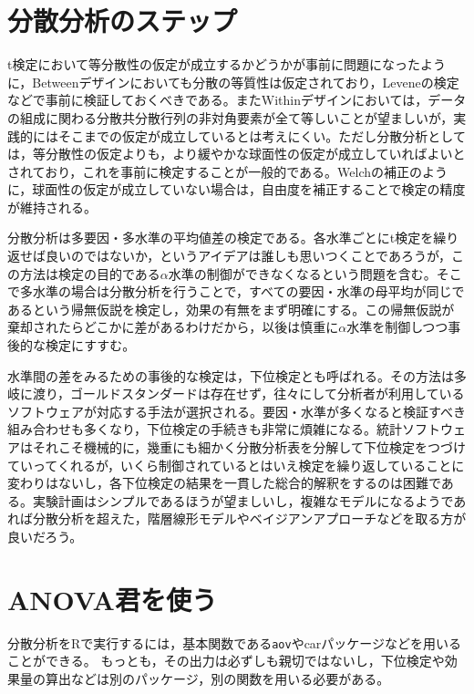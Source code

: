 \documentclass[
  a4paper,
]{ltjsbook}
\begin{document}
\section{分散分析のステップ}\label{ux5206ux6563ux5206ux6790ux306eux30b9ux30c6ux30c3ux30d7}

t検定において等分散性の仮定が成立するかどうかが事前に問題になったように，Betweenデザインにおいても分散の等質性は仮定されており，Leveneの検定などで事前に検証しておくべきである。またWithinデザインにおいては，データの組成に関わる分散共分散行列の非対角要素が全て等しいことが望ましいが，実践的にはそこまでの仮定が成立しているとは考えにくい。ただし分散分析としては，等分散性の仮定よりも，より緩やかな球面性の仮定が成立していればよいとされており，これを事前に検定することが一般的である。Welchの補正のように，球面性の仮定が成立していない場合は，自由度を補正することで検定の精度が維持される。

分散分析は多要因・多水準の平均値差の検定である。各水準ごとにt検定を繰り返せば良いのではないか，というアイデアは誰しも思いつくことであろうが，この方法は検定の目的である\(\alpha\)水準の制御ができなくなるという問題を含む。そこで多水準の場合は分散分析を行うことで，すべての要因・水準の母平均が同じであるという帰無仮説を検定し，効果の有無をまず明確にする。この帰無仮説が棄却されたらどこかに差があるわけだから，以後は慎重に\(\alpha\)水準を制御しつつ事後的な検定にすすむ。

水準間の差をみるための事後的な検定は，下位検定とも呼ばれる。その方法は多岐に渡り，ゴールドスタンダードは存在せず，往々にして分析者が利用しているソフトウェアが対応する手法が選択される。要因・水準が多くなると検証すべき組み合わせも多くなり，下位検定の手続きも非常に煩雑になる。統計ソフトウェアはそれこそ機械的に，幾重にも細かく分散分析表を分解して下位検定をつづけていってくれるが，いくら制御されているとはいえ検定を繰り返していることに変わりはないし，各下位検定の結果を一貫した総合的解釈をするのは困難である。実験計画はシンプルであるほうが望ましいし，複雑なモデルになるようであれば分散分析を超えた，階層線形モデルやベイジアンアプローチなどを取る方が良いだろう。

\section{ANOVA君を使う}\label{anovaux541bux3092ux4f7fux3046}

分散分析をRで実行するには，基本関数である\texttt{aov}やcarパッケージなどを用いることができる。
もっとも，その出力は必ずしも親切ではないし，下位検定や効果量の算出などは別のパッケージ，別の関数を用いる必要がある。
\end{document}
